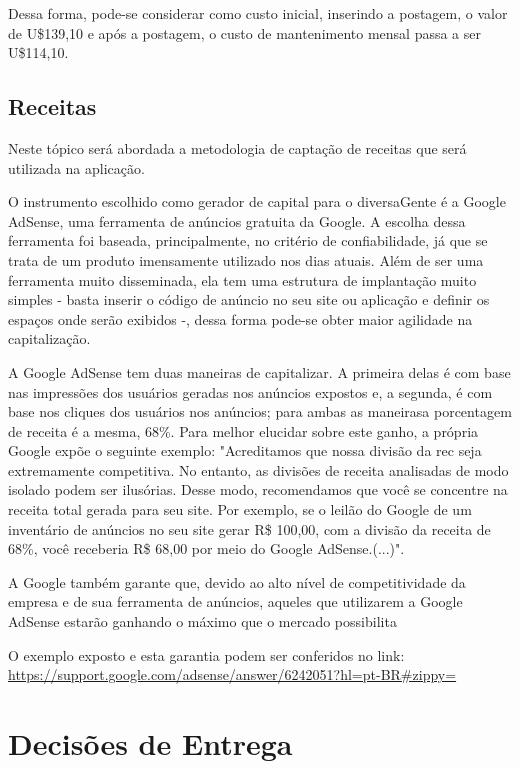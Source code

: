 Dessa forma, pode-se considerar como custo inicial, inserindo a postagem, o valor de U\$139,10 e após a postagem, o custo de mantenimento mensal passa a ser U\$114,10.

\subsection{Receitas}

Neste tópico será abordada a metodologia de captação de receitas que será utilizada na aplicação.

O instrumento escolhido como gerador de capital para o diversaGente é a Google AdSense, uma ferramenta de anúncios gratuita da Google. A escolha dessa ferramenta foi baseada, principalmente, no critério de confiabilidade, já que se trata de um produto imensamente utilizado nos dias atuais. Além de ser uma ferramenta muito disseminada, ela tem uma estrutura de implantação muito simples - basta inserir o código de anúncio no seu site ou aplicação e definir os espaços onde serão exibidos -, dessa forma pode-se obter maior agilidade na capitalização.

A Google AdSense tem duas maneiras de capitalizar. A primeira delas é com base nas impressões dos usuários geradas nos anúncios expostos e, a segunda, é com base nos cliques dos usuários nos anúncios; para ambas as maneirasa porcentagem de receita é a mesma, 68\%. Para melhor elucidar sobre este ganho, a própria Google expõe o seguinte exemplo: "Acreditamos que nossa divisão da rec seja extremamente competitiva. No entanto, as divisões de receita analisadas de modo isolado podem ser ilusórias. Desse modo, recomendamos que você se concentre na receita total gerada para seu site. Por exemplo, se o leilão do Google de um inventário de anúncios no seu site gerar R\$ 100,00, com a divisão da receita de 68\%, você receberia R\$ 68,00 por meio do Google AdSense.(...)". 

A Google também garante que, devido ao alto nível de competitividade da empresa e de sua ferramenta de anúncios, aqueles que utilizarem a Google AdSense estarão ganhando o máximo que o mercado possibilita

O exemplo exposto e esta garantia podem ser conferidos no link:\\ \hyperlink{Link da Google AdSense}{https://support.google.com/adsense/answer/6242051?hl=pt-BR#zippy=}

\section{Decisões de Entrega}

